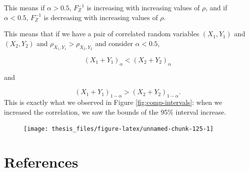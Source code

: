 \documentclass[12pt,twoside]{smiththesis}
\begin{document}
This means if \(\alpha > 0.5\), \(F_Z^{-1}\) is increasing with increasing values of \(\rho\), and if \(\alpha < 0.5\), \(F_Z^{-1}\) is decreasing with increasing values of \(\rho\).

This means that if we have a pair of correlated random variables \((X_1,Y_1)\) and \((X_2,Y_2)\) and \(\rho_{X_1,Y_1} > \rho_{X_2,Y_2}\) and consider \(\alpha < 0.5\),

\[(X_1+Y_1)_\alpha <(X_2+Y_2)_\alpha\]

and

\[(X_1+Y_1)_{1-\alpha} > (X_2+Y_2)_{1-\alpha}.\]
This is exactly what we observed in Figure \ref{fig:comp-intervals}: when we increased the correlation, we saw the bounds of the 95\% interval increase.
\begin{figure}

{\centering \texttt{[image: thesis\_files/figure-latex/unnamed-chunk-125-1]} 

}

\caption{\label{fig:erf}}\label{fig:unnamed-chunk-125}
\end{figure}
\backmatter

\hypertarget{references}{%
\chapter*{References}\label{references}}


\noindent

\setlength{\parindent}{-0.20in}
\setlength{\leftskip}{0.20in}
\setlength{\parskip}{8pt}
\end{document}
